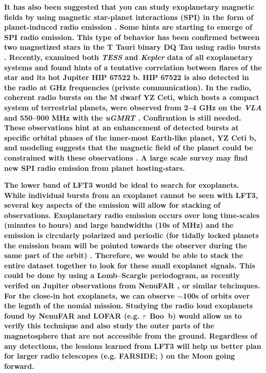 \textbf{It has also been suggested that you can study exoplanetary magnetic fields by using magnetic star-planet interactions (SPI) in the form of planet-induced radio emission \citep{Cuntz2000,Lanza2009,joe_nature_review}. Some hints are starting to emerge of SPI radio emission. This type of behavior has been confirmed between two magnetized stars in the T Tauri binary DQ Tau using radio bursts \citep{Salter2008}. Recently, \citep{Ilin2022,Ilin2024} examined both \textit{TESS} and \textit{Kepler} data of all exoplanetary systems and found hints of a tentative correlation between flares of the star and its hot Jupiter HIP 67522 b. HIP 67522 is also detected in the radio at GHz frequencies (private communication). In the radio, coherent radio bursts on the M dwarf YZ Ceti, which hosts a compact system of terrestrial planets, were observed from 2--4 GHz on the \textit{VLA} \citep{Pineda2023} and 550--900 MHz with the \textit{uGMRT} \citep{Trigilio2023}. Confirmtion is still needed. These observations hint at an enhancement of detected bursts at specific orbital phases of the inner-most Earth-like planet, YZ Ceti b, and modeling suggests that the magnetic field of the planet could be constrained with these observations \citep{Pineda2023,Trigilio2023}. A large scale survey may find new SPI radio emission from planet hosting-stars.}

\textbf{The lower band of LFT3 would be ideal to search for exoplanets. While individual bursts from an exoplanet cannot be seen with LFT3, several key aspects of the emission will allow for stacking of observations. Exoplanetary radio emission occurs over long time-scales (minutes to hours) and large bandwidths (10s of MHz) and the emission is circularly polarized and periodic (for tidally locked planets the emission beam will be pointed towards the observer during the same part of the orbit) \cite{Zarka2007}. Therefore, we would be able to stack the entire dataset together to look for these small exoplanet signals. This could be done by using a Lomb–Scargle periodogram, as recently verifed on Jupiter observations from NenuFAR \citep{Louis2025}, or similar tehcinques. For the close-in hot exoplanets, we can observe $\sim$100s of orbits over the legnth of the nomial mission. Studying the radio loud exoplanets found by NenuFAR and LOFAR (e.g. $\tau$~Boo~b) would allow us to verify this technique and also study the outer parts of the magnetosphere that are not accessible from the ground. Regardless of any detections, the lessions learned from LFT3 will help us better plan for larger radio telescopes (e.g. FARSIDE; \citealt{Burns2021_RSPTA}) on the Moon going forward. }

